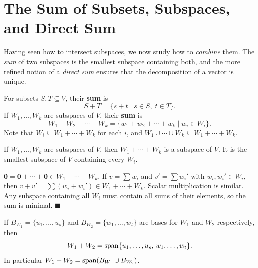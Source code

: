 \section{The Sum of Subsets, Subspaces, and Direct Sum}
\label{sec:directsum}

Having seen how to intersect subspaces, we now study how to \emph{combine}
them.  The \emph{sum} of two subspaces is the smallest subspace containing
both, and the more refined notion of a \emph{direct sum} ensures that the
decomposition of a vector is unique.

\begin{defbox}
\label{def:sum-subsets}
For subsets $S, T\subseteq V$, their \textbf{sum} is
\[
    S + T = \{s+t \mid s\in S,\; t\in T\}.
\]
If $W_1,\ldots,W_k$ are subspaces of $V$, their \textbf{sum} is
\[
    W_1 + W_2 + \cdots + W_k
    = \{w_1+w_2+\cdots+w_k \mid w_i\in W_i\}.
\]
Note that $W_i\subseteq W_1+\cdots+W_k$ for each $i$, and
$W_1\cup\cdots\cup W_k\subseteq W_1+\cdots+W_k$.
\end{defbox}

\begin{propbox}
\label{prop:sum-subspace}
If $W_1,\ldots,W_k$ are subspaces of $V$, then
$W_1+\cdots+W_k$ is a subspace of $V$.  It is the smallest subspace of $V$
containing every $W_i$.
\end{propbox}

\begin{proofbox}
$\mathbf{0}=\mathbf{0}+\cdots+\mathbf{0}\in W_1+\cdots+W_k$.  If
$v=\sum w_i$ and $v'=\sum w_i'$ with $w_i,w_i'\in W_i$, then
$v+v'=\sum(w_i+w_i')\in W_1+\cdots+W_k$.  Scalar multiplication is
similar.  Any subspace containing all $W_i$ must contain all sums of their
elements, so the sum is minimal.
\hfill$\blacksquare$
\end{proofbox}

\begin{tipbox}
If $B_{W_1}=\{u_1,\ldots,u_s\}$ and $B_{W_2}=\{w_1,\ldots,w_t\}$ are bases
for $W_1$ and $W_2$ respectively, then
\[
    W_1 + W_2 = \operatorname{span}\{u_1,\ldots,u_s,\, w_1,\ldots,w_t\}.
\]
In particular $W_1+W_2 = \operatorname{span}(B_{W_1}\cup B_{W_2})$.
\end{tipbox}

